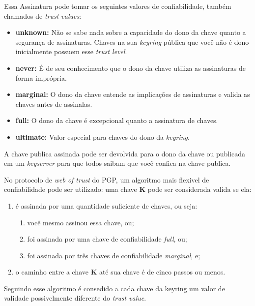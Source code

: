 \documentclass[12pt, letterpaper]{article}
\begin{document}
Essa Assinatura pode tomar os seguintes valores de confiabilidade,
também chamados de \textit{trust values}:
\begin{itemize}
  \item \textbf{unknown:}
    Não se sabe nada sobre a capacidade do dono da chave quanto a segurança de assinaturas.
    Chaves na sua \textit{keyring} pública que você não é dono inicialmente possuem esse \textit{trust level}.
  \item \textbf{never:}
    É de seu conhecimento que o dono da chave utiliza as assinaturas de forma imprópria.
  \item \textbf{marginal:}
    O dono da chave entende as implicações de assinaturas e valida as chaves antes de assinalas.
  \item \textbf{full:}
    O dono da chave é excepcional quanto a assinatura de chaves.
  \item \textbf{ultimate:}
    Valor especial para chaves do dono da \textit{keyring}.
\end{itemize}

A chave publica assinada pode ser devolvida para o dono da chave ou publicada em um
\textit{keyserver} para que todos saibam que você confica na chave publica.

No protocolo de \textit{web of trust} do PGP, um algoritmo mais flexivel de confiabilidade pode ser utilizado:
uma chave \textbf{K} pode ser considerada valida se ela:
\begin{enumerate}
    \item é assinada por uma quantidade suficiente de chaves, ou seja:
      \begin{enumerate}
          \item você mesmo assinou essa chave, ou;
          \item foi assinada por uma chave de confiabilidade \textit{full}, ou;
          \item foi assinada por três chaves de confiabilidade \textit{marginal}, e;
      \end{enumerate}
    \item o caminho entre a chave \textbf{K} até sua chave é de
      cinco passos ou menos.
\end{enumerate}

Seguindo esse algoritmo é consedido a cada chave da keyring um valor de validade possivelmente
diferente do \textit{trust value}.
\end{document}
